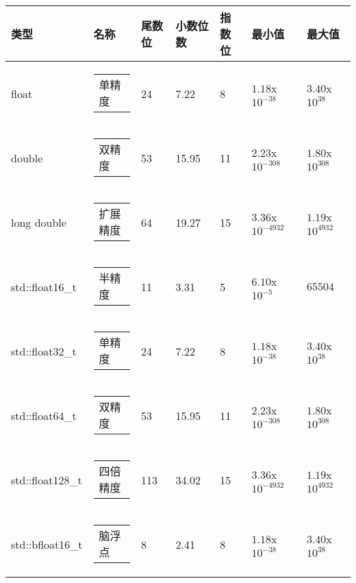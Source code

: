 \begin{longtable}{|l|l|l|l|l|l|l|}
\hline
\textbf{类型} &
\textbf{名称} &
\textbf{尾数位} &
\textbf{小数位数} &
\textbf{指数位} &
\textbf{最小值} &
\textbf{最大值} \\ \hline
\endfirsthead
%
\endhead
%
float           & \begin{tabular}[c]{@{}l@{}}单精度\end{tabular}   & 24 & 7.22  & 8  & $1.18$x$10^{-38}$   & $3.40$x$10^{38}$   \\ \hline
double          & \begin{tabular}[c]{@{}l@{}}双精度\end{tabular}   & 53 & 15.95 & 11 & $2.23$x$10^{-308}$  & $1.80$x$10^{308}$  \\ \hline
long double     & \begin{tabular}[c]{@{}l@{}}扩展精度\end{tabular} & 64 & 19.27 & 15 & $3.36$x$10^{-4932}$ & $1.19$x$10^{4932}$ \\ \hline
std::float16\_t & \begin{tabular}[c]{@{}l@{}}半精度\end{tabular}     & 11 & 3.31  & 5  & $6.10$x$10^{-5}$    & $65504$       \\ \hline
std::float32\_t & \begin{tabular}[c]{@{}l@{}}单精度\end{tabular}   & 24 & 7.22  & 8  & $1.18$x$10^{-38}$   & $3.40$x$10^{38}$   \\ \hline
std::float64\_t & \begin{tabular}[c]{@{}l@{}}双精度\end{tabular}   & 53 & 15.95 & 11 & $2.23$x$10^{-308}$  & $1.80$x$10^{308}$  \\ \hline
std::float128\_t &
\begin{tabular}[c]{@{}l@{}}四倍精度\end{tabular} &
113 &
34.02 &
15 &
$3.36$x$10^{-4932}$ &
$1.19$x$10^{4932}$ \\ \hline
std::bfloat16\_t &
\begin{tabular}[c]{@{}l@{}}脑浮点\end{tabular} &
8 &
2.41 &
8 &
$1.18$x$10^{-38}$ &
$3.40$x$10^{38}$ \\ \hline
\end{longtable}

